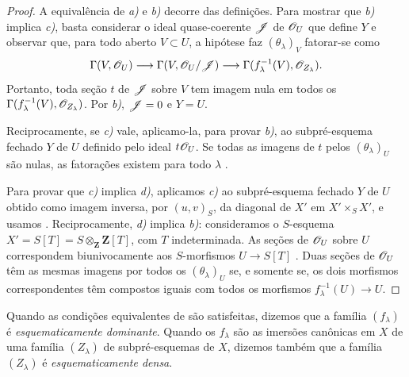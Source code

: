 \begin{proof}
A equivalência de
\emph{a)} e
\emph{b)} decorre
das definições.
Para mostrar que
\emph{b)} implica
\emph{c)}, basta
considerar o ideal
quase-coerente
$\mathscr{J}$ de
$\mathscr{O}_U$ que
define $Y$ e
observar que,
para todo aberto
$V\subset U$,
a hipótese faz
$(\theta_\lambda)_V$
fatorar-se como
\[
\Gamma(V,\mathscr{O}_U)
\longrightarrow
\Gamma(V,\mathscr{O}_U/\mathscr{J})
\longrightarrow
\Gamma(f_\lambda^{-1}(V),
\mathscr{O}_{Z_\lambda}).
\]
Portanto, toda
seção $t$ de
$\mathscr{J}$ sobre
$V$ tem imagem
nula em todos os
$\Gamma(
f_\lambda^{-1}(V),
\mathscr{O}_{Z_\lambda})$.
Por \emph{b)},
$\mathscr{J}=0$ e
$Y=U$.

Reciprocamente,
se \emph{c)}
vale, aplicamo-la,
para provar
\emph{b)}, ao
subpré-esquema
fechado $Y$ de
$U$ definido
pelo ideal
$t\mathscr{O}_U$.
Se todas as
imagens de $t$
pelos
$(\theta_\lambda)_U$
são nulas, as
fatorações
existem para
todo $\lambda$
.

Para provar que
\emph{c)} implica
\emph{d)}, aplicamos
\emph{c)} ao
subpré-esquema
fechado $Y$
de $U$ obtido
como imagem
inversa, por
$(u,v)_S$, da
diagonal de
$X'$ em
$X'\times_S X'$,
e usamos
.
Reciprocamente,
\emph{d)} implica
\emph{b)}:
consideramos o
$S$-esquema
$X'=S[T]=
S\otimes_{\mathbf Z}
\mathbf Z[T]$,
com $T$
indeterminada.
As seções de
$\mathscr{O}_U$ sobre
$U$ correspondem
biunivocamente
aos
$S$-morfismos
$U\to S[T]$
.
Duas seções de
$\mathscr{O}_U$ têm
as mesmas imagens
por todos os
$(\theta_\lambda)_U$
se, e somente se,
os dois morfismos
correspondentes
têm compostos
iguais com todos
os morfismos
$f_\lambda^{-1}(U)
\to U$.
\end{proof}


\begin{definition}[11.10.2]
\label{IV.11.10.2}
Quando as condições
equivalentes de
são satisfeitas,
dizemos que a família
$(f_\lambda)$ é
\emph{esquematicamente
dominante}. Quando os
$f_\lambda$ são as
imersões canônicas
em $X$ de uma família
$(Z_\lambda)$ de
subpré-esquemas de
$X$, dizemos também
que a família
$(Z_\lambda)$ é
\emph{esquematicamente
densa}.
\end{definition}

